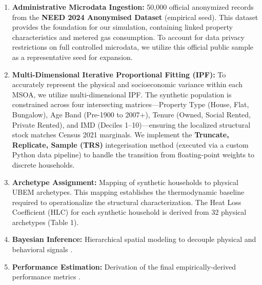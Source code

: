 \documentclass[11pt, a4paper, twocolumn, numbers]{elsarticle}
\newcommand{\tightlist}{%
  \setlength{\itemsep}{0pt}\setlength{\parskip}{0pt}}
\begin{document}
\begin{enumerate}
\def\labelenumi{\arabic{enumi}.}
\tightlist
\item
  \textbf{Administrative Microdata Ingestion:} 50,000 official
  anonymized records from the \textbf{NEED 2024 Anonymised Dataset}
  (empirical seed). This dataset provides the foundation for our
  simulation, containing linked property characteristics and metered gas
  consumption. To account for data privacy restrictions on full
  controlled microdata, we utilize this official public sample as a
  representative seed for expansion.
\item
  \textbf{Multi-Dimensional Iterative Proportional Fitting (IPF):} To accurately represent the physical and socioeconomic variance within each MSOA, we utilize multi-dimensional IPF. The synthetic population is constrained across four intersecting matrices---Property Type (House, Flat, Bungalow), Age Band (Pre-1900 to 2007+), Tenure (Owned, Social Rented, Private Rented), and IMD (Deciles 1--10)---ensuring the localized structural stock matches Census 2021 marginals. We implement the \textbf{Truncate, Replicate, Sample (TRS)} integerisation method \cite{Smith2017} (executed via a custom Python data pipeline) to handle the transition from floating-point weights to discrete households.
\item
  \textbf{Archetype Assignment:} Mapping of synthetic households to
  physical UBEM archetypes. This mapping establishes the thermodynamic 
  baseline required to operationalize the structural characterization. The Heat Loss Coefficient (HLC) for each synthetic household is derived from 32 physical archetypes (Table 1).
\item
  \textbf{Bayesian Inference:} Hierarchical spatial modeling to decouple
  physical and behavioral signals \cite{NetoBradley2021}.
\item
  \textbf{Performance Estimation:} Derivation of the final empirically-derived
  performance metrics \cite{Nidam2023}.
\end{enumerate}
\end{document}
